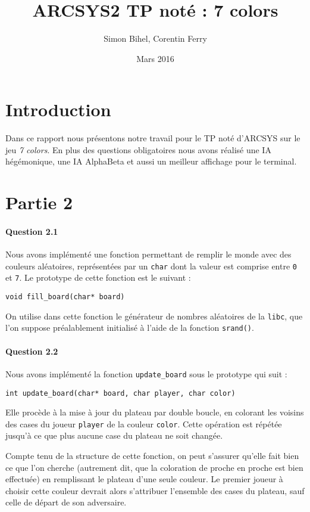 \documentclass[a4paper]{article}
\title{ARCSYS2 TP noté : 7 colors}
\author{Simon Bihel, Corentin Ferry}
\date{Mars 2016}
\begin{document}
    \maketitle

    \section{Introduction}
    Dans ce rapport nous présentons notre travail pour le TP noté d'ARCSYS sur 
    le jeu \textit{7 colors}. En plus des questions obligatoires nous avons 
    réalisé une IA hégémonique, une IA AlphaBeta et aussi un meilleur affichage 
    pour le terminal.

    \section{Partie 2}
    \paragraph{Question 2.1}
    Nous avons implémenté une fonction permettant de remplir le monde avec
des couleurs aléatoires, représentées par un \texttt{char} dont la valeur est
comprise entre \texttt{0} et \texttt{7}.
Le prototype de cette fonction est le suivant :
\begin{lstlisting}
void fill_board(char* board)
\end{lstlisting}
On utilise dans cette fonction le générateur de nombres aléatoires de la
\texttt{libc}, que l'on suppose préalablement initialisé à l'aide de la
fonction \texttt{srand()}.

    \paragraph{Question 2.2}

    Nous avons implémenté la fonction \texttt{update\_board} sous le prototype 
qui suit :
\begin{lstlisting}
int update_board(char* board, char player, char color)
\end{lstlisting}
Elle procède à la mise à jour du plateau par double boucle, en colorant les 
voisins des cases du joueur \texttt{player} de la couleur \texttt{color}.
Cette opération est répétée jusqu'à ce que plus aucune case du plateau ne soit 
changée.

Compte tenu de la structure de cette fonction, on peut s'assurer qu'elle fait 
bien ce que l'on cherche (autrement dit, que la coloration de proche en proche 
est bien effectuée) en remplissant le plateau d'une seule couleur. Le premier 
joueur à choisir cette couleur devrait alors s'attribuer l'ensemble des cases 
du plateau, sauf celle de départ de son adversaire. 
\end{document}
